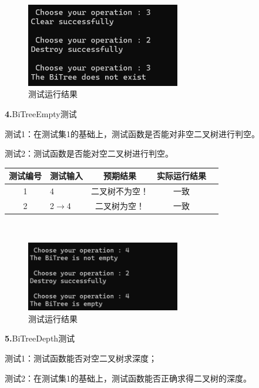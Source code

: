 \documentclass[supercite]{Experimental_Report}
\theoremstyle{definition}
\begin{document}
~\

\begin{figure}[H]
 	\centering
 	\includegraphics[width=0.6\textwidth]{images/二叉树测试3.png}
 	\caption{测试运行结果}
 	\label{txlab}
 \end{figure}

\noindent\textbf{ 4.}BiTreeEmpty测试

测试1：在测试集1的基础上，测试函数是否能对非空二叉树进行判空。

测试2：测试函数是否能对空二叉树进行判空。

\vspace{0.5em}

\begin{tabular}{|c|l|c|c|c|}
	\hline
	测试编号 & 测试输入 & 预期结果 & 实际运行结果 \\
	\hline
	1 & 4 & 二叉树不为空！ & 一致 \\
	\hline
	2 & 2$\rightarrow$4 & 二叉树为空！ & 一致 \\
	\hline
\end{tabular}

~\

\begin{figure}[H]
 	\centering
 	\includegraphics[width=0.6\textwidth]{images/二叉树测试4.png}
 	\caption{测试运行结果}
 	\label{txlab}
 \end{figure}

\noindent\textbf{ 5.}BiTreeDepth测试

测试1：测试函数能否对空二叉树求深度；

测试2：在测试集1的基础上，测试函数能否正确求得二叉树的深度。

\vspace{0.5em}
\end{document}

